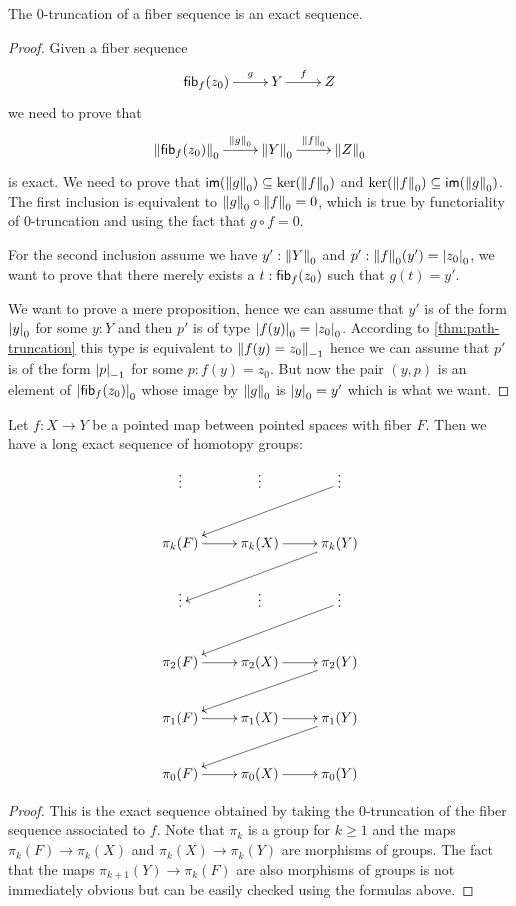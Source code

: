 \begin{lem}
  The $0$-truncation of a fiber sequence is an exact sequence.
\end{lem}
\begin{proof}
  Given a fiber sequence
  \[\xymatrix{\hfib{f}{z_0} \ar^-g[r] & Y \ar^-f[r] & Z}\]
  we need to prove that
  \[\xymatrix{\trunc{0}{\hfib{f}{z_0}} \ar^-{\trunc0g}[r] & \trunc0{Y}
    \ar^-{\trunc0{f}}[r] & \trunc0{Z}}\]
  is exact.
  We need to prove that $\im(\trunc0g)\subseteq\ker(\trunc0f)$ and
  $\ker(\trunc0f)\subseteq\im(\trunc0g)$.
  The first inclusion is equivalent to $\trunc0g\circ\trunc0f=0$, which is true
  by functoriality of 0-truncation and using the fact that $g\circ f=0$.

  For the second inclusion assume we have $y':\trunc0Y$ and
  $p':\trunc0f(y')=\tproj0{z_0}$, we want to prove that there merely exists a
  $t:\hfib{f}{z_0}$ such that $g(t)=y'$.

  We want to prove a mere proposition, hence we can assume that $y'$ is of the
  form $\tproj0y$ for some $y:Y$ and then $p'$ is of type
  $\tproj0{f(y)}=\tproj0{z_0}$. According to \autoref{thm:path-truncation} this
  type is equivalent to $\trunc{-1}{f(y)=z_0}$ hence we can assume that $p'$ is
  of the form $\tproj{-1}{p}$ for some $p:f(y)=z_0$. But now the pair $(y,p)$ is
  an element of $\tproj0{\hfib{f}{z_0}}$ whose image by $\trunc0g$ is
  $\tproj0y=y'$ which is what we want.
\end{proof}

\vspace*{0pt plus 10ex}
\goodbreak

\begin{thm}\label{thm:les}
  Let $f:X \to Y$ be a pointed map between pointed spaces with fiber $F$. Then
  we have a long exact sequence of homotopy groups:
  \[
  \xymatrix{
    \vdots & \vdots & \vdots \ar[lld] \\
    \pi_k(F) \ar[r] & \pi_k(X) \ar[r] & \pi_k(Y) \ar[lld] \\
    \vdots & \vdots & \vdots \ar[lld] \\
    \pi_2(F) \ar[r] & \pi_2(X) \ar[r] & \pi_2(Y) \ar[lld] \\
    \pi_1(F) \ar[r] & \pi_1(X) \ar[r] & \pi_1(Y) \ar[lld]\\
    \pi_0(F) \ar[r] & \pi_0(X) \ar[r] & \pi_0(Y)}
  \]
\end{thm}
\begin{proof}
  This is the exact sequence obtained by taking the $0$-truncation of the fiber
  sequence associated to $f$. Note that $\pi_k$ is a group for $k\ge1$ and the
  maps $\pi_k(F)\to\pi_k(X)$ and $\pi_k(X)\to\pi_k(Y)$ are morphisms of groups.
  The fact that the maps $\pi_{k+1}(Y)\to\pi_k(F)$ are also morphisms of groups
  is not immediately obvious but can be easily checked using the formulas above.
\end{proof}

